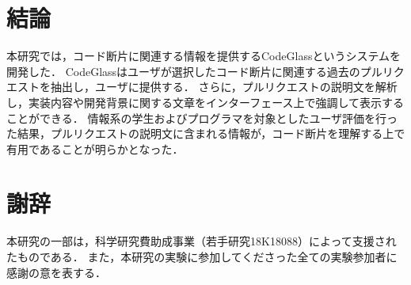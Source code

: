\section{結論}

本研究では，コード断片に関連する情報を提供するCodeGlassというシステムを開発した．
CodeGlassはユーザが選択したコード断片に関連する過去のプルリクエストを抽出し，ユーザに提供する．
さらに，プルリクエストの説明文を解析し，実装内容や開発背景に関する文章をインターフェース上で強調して表示することができる．
情報系の学生およびプログラマを対象としたユーザ評価を行った結果，プルリクエストの説明文に含まれる情報が，コード断片を理解する上で有用であることが明らかとなった．



\section*{謝辞}

本研究の一部は，科学研究費助成事業（若手研究18K18088）によって支援されたものである．
また，本研究の実験に参加してくださった全ての実験参加者に感謝の意を表する．
